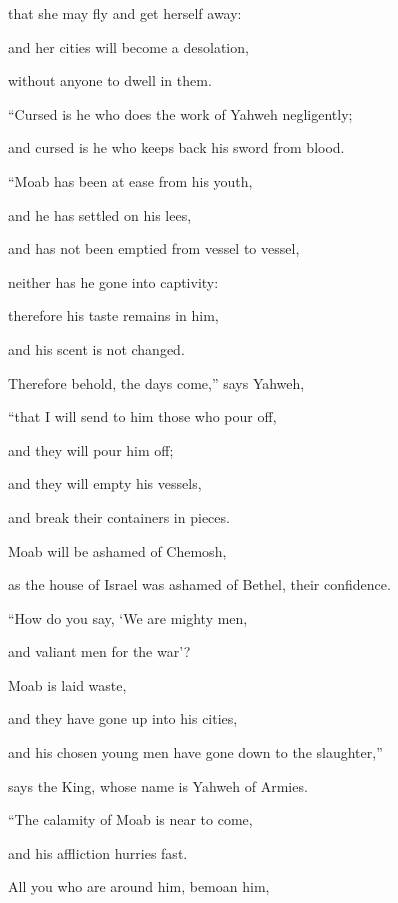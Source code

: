 {\par }{\QB that she may fly and get herself away:
\par }{\Q and her cities will become a desolation,
\par }{\QB without anyone to dwell in them.
\par }{\BB \par }{\Q {}“Cursed is he who does the work of Yahweh negligently;
\par }{\QB and cursed is he who keeps back his sword from blood.
\par }{\BB \par }{\Q {}“Moab has been at ease from his youth,
\par }{\QB and he has settled on his lees,
\par }{\Q and has not been emptied from vessel to vessel,
\par }{\QB neither has he gone into captivity:
\par }{\Q therefore his taste remains in him,
\par }{\QB and his scent is not changed.
\par }{\Q {}Therefore behold, the days come,” says Yahweh,
\par }{\QB “that I will send to him those who pour off,
\par }{\Q and they will pour him off;
\par }{\QB and they will empty his vessels,
\par }{\QB and break their containers in pieces.
\par }{\Q {}Moab will be ashamed of Chemosh,
\par }{\QB as the house of Israel was ashamed of Bethel, their confidence.
\par }{\BB \par }{\Q {}“How do you say, ‘We are mighty men,
\par }{\QB and valiant men for the war’?
\par }{\Q {}Moab is laid waste,
\par }{\QB and they have gone up into his cities,
\par }{\QB and his chosen young men have gone down to the slaughter,”
\par }{\QB says the King, whose name is Yahweh of Armies.
\par }{\Q {}“The calamity of Moab is near to come,
\par }{\QB and his affliction hurries fast.
\par }{\Q {}All you who are around him, bemoan him,
}
